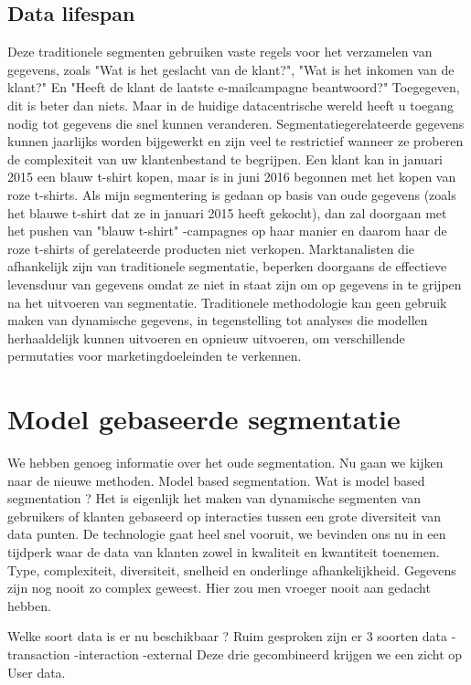 \subsection{Data lifespan}
Deze traditionele segmenten gebruiken vaste regels voor het verzamelen van gegevens, zoals "Wat is het geslacht van de klant?", "Wat is het inkomen van de klant?" En "Heeft de klant de laatste e-mailcampagne beantwoord?" Toegegeven, dit is beter dan niets. Maar in de huidige datacentrische wereld heeft u toegang nodig tot gegevens die snel kunnen veranderen. 
Segmentatiegerelateerde gegevens kunnen jaarlijks worden bijgewerkt en zijn veel te restrictief wanneer ze proberen de complexiteit van uw klantenbestand te begrijpen. Een klant kan in januari 2015 een blauw t-shirt kopen, maar is in juni 2016 begonnen met het kopen van roze t-shirts. Als mijn segmentering is gedaan op basis van oude gegevens (zoals het blauwe t-shirt dat ze in januari 2015 heeft gekocht), dan zal doorgaan met het pushen van "blauw t-shirt" -campagnes op haar manier en daarom haar de roze t-shirts of gerelateerde producten niet verkopen.
Marktanalisten die afhankelijk zijn van traditionele segmentatie, beperken doorgaans de effectieve levensduur van gegevens omdat ze niet in staat zijn om op gegevens in te grijpen na het uitvoeren van segmentatie. Traditionele methodologie kan geen gebruik maken van dynamische gegevens, in tegenstelling tot analyses die modellen herhaaldelijk kunnen uitvoeren en opnieuw uitvoeren, om verschillende permutaties voor marketingdoeleinden te verkennen.

\section{Model gebaseerde segmentatie}
We hebben genoeg informatie over het oude segmentation. Nu gaan we kijken naar de nieuwe methoden. Model based segmentation. Wat is model based segmentation ? Het is eigenlijk het maken van dynamische segmenten van gebruikers of klanten gebaseerd op interacties tussen een grote diversiteit van data punten. De technologie gaat heel snel vooruit, we bevinden ons nu in een tijdperk waar de data van klanten zowel in kwaliteit en kwantiteit toenemen. Type, complexiteit, diversiteit, snelheid en onderlinge afhankelijkheid. Gegevens zijn nog nooit zo complex geweest. Hier zou men vroeger nooit aan gedacht hebben.

Welke soort data is er nu beschikbaar ? \newline
Ruim gesproken zijn er 3 soorten data\newline
-transaction\newline
-interaction\newline
-external\newline
Deze drie gecombineerd krijgen we een  zicht op User data. \newline

